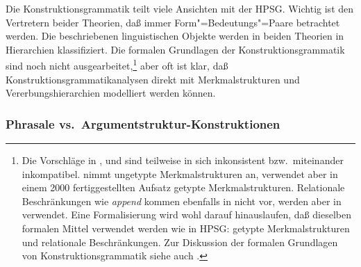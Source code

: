 Die Konstruktionsgrammatik teilt viele Ansichten mit der HPSG. Wichtig ist
den Vertretern beider Theorien, daß immer Form"=Bedeutungs"=Paare betrachtet werden. Die beschriebenen
linguistischen Objekte werden in beiden Theorien in Hierarchien klassifiziert. Die formalen Grundlagen
der Konstruktionsgrammatik sind noch nicht ausgearbeitet,\footnote{%
  Die Vorschläge in ,  und  sind teilweise
  in sich inkonsistent bzw.\ miteinander inkompatibel.
\citet{Kay2002a} nimmt ungetypte Merkmalstrukturen an,
  verwendet aber in einem 2000 fertiggestellten Aufsatz \citep{Kay2005a} getypte Merkmalstrukturen. Relationale Beschränkungen
  wie \emph{append} kommen ebenfalls in  nicht vor, werden aber in 
  verwendet. Eine Formalisierung wird wohl darauf hinauslaufen, daß
  dieselben formalen Mittel verwendet werden wie in HPSG: getypte Merkmalstrukturen und
  relationale Beschränkungen. 
  Zur Diskussion der formalen Grundlagen von Konstruktionsgrammatik siehe auch .%
} aber oft ist klar, daß 
Konstruktionsgrammatikanalysen direkt mit Merkmalstrukturen und Vererbungshierarchien
modelliert werden können.

\subsubsection{Phrasale vs.\ Argumentstruktur-Konstruktionen}
\label{sec-phrasal-lexikalisch-rc}

